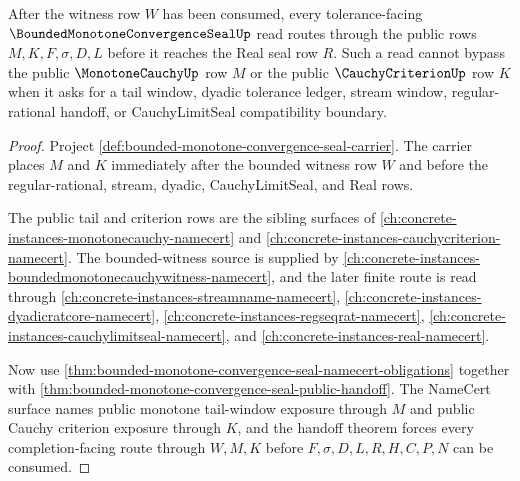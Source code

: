 \begin{theorem}
\label{thm:bounded-monotone-convergence-seal-criterion-route}
After the witness row $W$ has been consumed, every tolerance-facing $\BoundedMonotoneConvergenceSealUp$ read routes through the public rows $M,K,F,\sigma,D,L$ before it reaches the Real seal row $R$. Such a read cannot bypass the public $\MonotoneCauchyUp$ row $M$ or the public $\CauchyCriterionUp$ row $K$ when it asks for a tail window, dyadic tolerance ledger, stream window, regular-rational handoff, or CauchyLimitSeal compatibility boundary.
\end{theorem}
\begin{proof}
Project \autoref{def:bounded-monotone-convergence-seal-carrier}. The carrier places $M$ and $K$ immediately after the bounded witness row $W$ and before the regular-rational, stream, dyadic, CauchyLimitSeal, and Real rows.

The public tail and criterion rows are the sibling surfaces of \autoref{ch:concrete-instances-monotonecauchy-namecert} and \autoref{ch:concrete-instances-cauchycriterion-namecert}. The bounded-witness source is supplied by \autoref{ch:concrete-instances-boundedmonotonecauchywitness-namecert}, and the later finite route is read through \autoref{ch:concrete-instances-streamname-namecert}, \autoref{ch:concrete-instances-dyadicratcore-namecert}, \autoref{ch:concrete-instances-regseqrat-namecert}, \autoref{ch:concrete-instances-cauchylimitseal-namecert}, and \autoref{ch:concrete-instances-real-namecert}.

Now use \autoref{thm:bounded-monotone-convergence-seal-namecert-obligations} together with \autoref{thm:bounded-monotone-convergence-seal-public-handoff}. The NameCert surface names public monotone tail-window exposure through $M$ and public Cauchy criterion exposure through $K$, and the handoff theorem forces every completion-facing route through $W,M,K$ before $F,\sigma,D,L,R,H,C,P,N$ can be consumed.
\end{proof}

